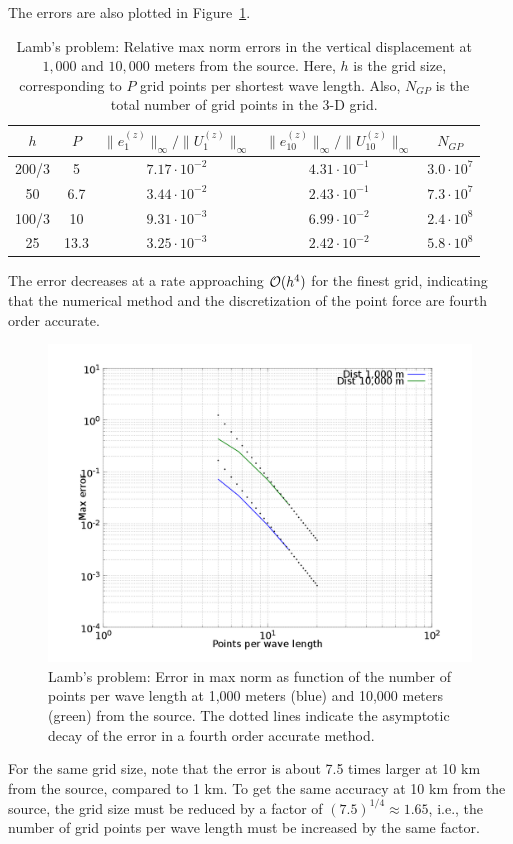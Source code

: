 \documentclass[11pt]{report}
\begin{document}
The errors are also plotted in Figure~\ref{fig:ppw-err}.
\begin{table}
\begin{center}
\begin{tabular}{| c | c | c | c | c |}
\hline
$h$ & $P$  & $\| e_1^{(z)}\|_\infty / \|U_1^{(z)}\|_\infty$  & $\| e_{10}^{(z)}\|_\infty /
\|U_{10}^{(z)}\|_\infty$ & $N_{GP}$ \\ \hline
 200/3 & 5   & $7.17\cdot 10^{-2}$  & $4.31\cdot 10^{-1}$ & $3.0\cdot 10^7$ \\ \hline
 50    & 6.7 & $3.44\cdot 10^{-2}$  & $2.43\cdot 10^{-1}$ & $7.3\cdot 10^7$ \\ \hline
 100/3 & 10  & $9.31\cdot 10^{-3}$  & $6.99\cdot 10^{-2}$ & $2.4\cdot 10^8$ \\ \hline
 25    & 13.3 & $3.25\cdot 10^{-3}$ & $2.42\cdot 10^{-2}$ & $5.8\cdot 10^8$ \\ \hline
\end{tabular}
\caption{Lamb's problem: Relative max norm errors in the vertical displacement at $1,000$ and
  $10,000$ meters from the source. Here, $h$ is the grid size, corresponding to $P$ grid points per
  shortest wave length. Also, $N_{GP}$ is the total number of grid points in the 3-D grid.}
\label{tab:lamb-err}
\end{center}
\end{table}
The error decreases at a rate approaching ${\cal O}(h^4)$ for the finest grid, indicating that the
numerical method and the discretization of the point force are fourth order accurate.
\begin{figure}[htp]
\begin{centering}
  \includegraphics[width=0.8\linewidth]{ppw-err.png}
  \caption{Lamb's problem: Error in max norm as function of the number of points per wave length at
    1,000 meters (blue) and 10,000 meters (green) from the source. The
    dotted lines indicate the asymptotic decay of the error in a fourth order accurate method.}
  \label{fig:ppw-err}
\end{centering}
\end{figure}
For the same grid size, note that the error is about 7.5 times larger at 10 km from the source,
compared to 1 km. To get the same accuracy at 10 km from the source, the grid size must be reduced
by a factor of $(7.5)^{1/4}\approx 1.65$, i.e., the number of grid points per wave length must be
increased by the same factor.
\end{document}
